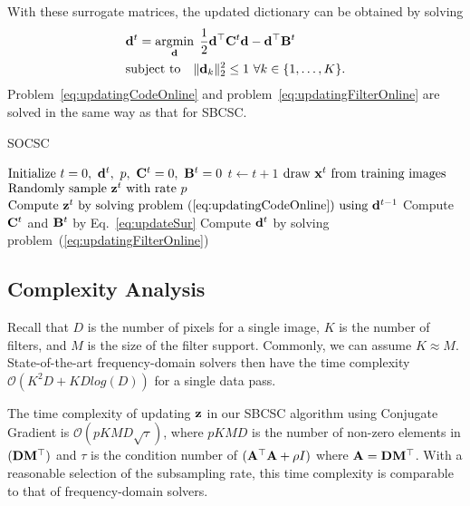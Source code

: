 With these surrogate matrices, the updated dictionary can be obtained
by solving
\begin{equation} \label{eq:updatingFilterOnline}
\begin{split}
    & \filter^t = \minimize{\filter} \frac{1}{2} \filter^\top \surC^t\filter - \filter^\top \surB^t \\& \text{subject to} \quad \|\filter_k\|_2^2 \leq 1 ~ \forall k \in \{1,\dots,K\}.
\end{split}
\end{equation}
Problem~\eqref{eq:updatingCodeOnline} and
problem~\eqref{eq:updatingFilterOnline} are solved in the same way as
that for SBCSC.

\begin{algorithm}[H]
\caption{SOCSC} \label{algo:SOCSC}
\begin{algorithmic}[1]
\State $\text{Initialize} ~ t=0, ~\filter^t, ~p, ~\surC^t = 0, ~\surB^t = 0$
    \State $t \gets t+1$
    \State $ \text{draw } \signal^t \text{ from training images} $
    \State $ \text{Randomly sample }\code^t \text{ with rate } p $
    \State $ \text{Compute } \code^t \text{ by solving problem~(\ref{eq:updatingCodeOnline}) using } \filter^{t-1}$
    \State Compute $\surC^t$ and $\surB^t$ by Eq.~\ref{eq:updateSur}
    \State Compute $\filter^t$ by solving problem~(\ref{eq:updatingFilterOnline})
\EndWhile
\end{algorithmic}
\end{algorithm}

\subsection{Complexity Analysis}
Recall that $D$ is the number of pixels for a single image, $K$ is the
number of filters, and $M$ is the size of the filter
support. Commonly, we can assume $K \approx M$.  State-of-the-art
frequency-domain solvers then have the time complexity
$\mathcal{O}(K^2D + KDlog(D))$ for a single data pass.

The time complexity of updating $\code$ in our SBCSC algorithm using
Conjugate Gradient is $\mathcal{O}(pKMD \sqrt{\tau})$, where $pKMD$ is
the number of non-zero elements in $(\Filter \mask^\top)$ and $\tau$
is the condition number of $(\matA^\top \matA + \rho I)$ where $\matA
= \Filter \mask^\top$. With a reasonable selection of the subsampling
rate, this time complexity is comparable to that of frequency-domain
solvers.

